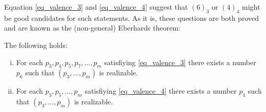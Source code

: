 Equation \ref{eq_valence_3} and \ref{eq_valence_4} suggest that $(6)_3$ or $(4)_4$ might be good candidates for such statements. As it is, these questions are both proved and are known as the (non-general) Eberhards theorem:

\begin{theorem} The following holds:
  \begin{enumerate}[(i)]
  \item For each $p_3, p_4, p_5, p_7, \dots, p_m$ satisfiying \ref{eq_valence_3} there exists a number $p_6$ such that $(p_3, \dots, p_m)$ is realizable.
  \item For each $p_3, p_5, \dots, p_m$ satisfiying \ref{eq_valence_4} there exists a number $p_4$ such that $(p_3, \dots, p_m)$ is realizable.
  \end{enumerate}
\end{theorem}

